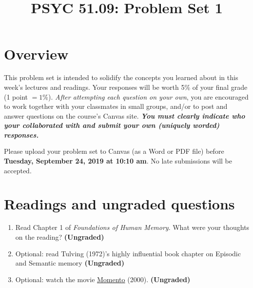 \documentclass[11pt]{article}
\title{PSYC 51.09: Problem Set 1}
\date{}
\begin{document}
\maketitle
\vspace{-0.75in}
\section*{Overview}
This problem set is intended to solidify the concepts you learned
about in this week's lectures and readings.  Your responses will be
worth 5\% of your final grade (1 point $= 1\%$).  \textit{After attempting
each question on your own}, you are encouraged
to work together with your classmates in small groups, and/or to post
and answer questions on the course’s Canvas site.
\textbf{\textit{You must clearly indicate who your collaborated with and submit your own (uniquely worded) responses.}}

Please upload your problem set to Canvas (as a Word or PDF file) before \textbf{Tuesday, September 24, 2019 at 10:10 am}.  No late submissions will be accepted.

\section*{Readings and ungraded questions}
\begin{enumerate}
\item Read Chapter 1 of \textit{Foundations of Human Memory}.  What were your thoughts on the reading?
  \textbf{(Ungraded)}

\item Optional: read Tulving (1972)'s highly influential book chapter
  on Episodic and Semantic memory
  \textbf{(Ungraded)}

\item Optional: watch the movie \underline{Momento} (2000).  \textbf{(Ungraded)}
\end{enumerate}
\end{document}
